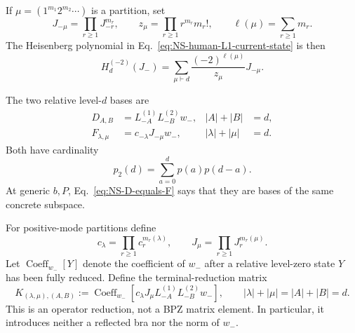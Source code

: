 \documentclass[11pt]{article}
\begin{document}
If \(\mu=(1^{m_1}2^{m_2}\cdots)\) is a partition, set
\begin{equation}
 J_{-\mu}=\prod_{r\geq1}J_{-r}^{m_r},
 \qquad
 z_\mu=\prod_{r\geq1}r^{m_r}m_r!,
 \qquad
 \ell(\mu)=\sum_{r\geq1}m_r.
\end{equation}
The Heisenberg polynomial in Eq.~\eqref{eq:NS-human-L1-current-state} is
then
\begin{equation}
 H_d^{(-2)}(J_-)
 =\sum_{\mu\vdash d}
   \frac{(-2)^{\ell(\mu)}}{z_\mu}J_{-\mu}.
 \label{eq:NS-human-H-partition-expansion}
\end{equation}

The two relative level-\(d\) bases are
\begin{align}
 D_{A,B}
 &=L_{-A}^{(1)}L_{-B}^{(2)}w_-,
 &|A|+|B|&=d,
 \label{eq:NS-relative-double-Vir-basis}\\
 F_{\lambda,\mu}
 &=c_{-\lambda}J_{-\mu}w_-,
 &|\lambda|+|\mu|&=d.
 \label{eq:NS-relative-current-basis}
\end{align}
Both have cardinality
\begin{equation}
 p_2(d)=\sum_{a=0}^dp(a)p(d-a).
\end{equation}
At generic \(b,P\), Eq.~\eqref{eq:NS-D-equals-F} says that they are bases
of the same concrete subspace.

For positive-mode partitions define
\begin{equation}
 c_\lambda=\prod_{r\geq1}c_r^{m_r(\lambda)},
 \qquad
 J_\mu=\prod_{r\geq1}J_r^{m_r(\mu)}.
\end{equation}
Let \(\operatorname{Coeff}_{w_-}[Y]\) denote the coefficient of \(w_-\)
after a relative level-zero state \(Y\) has been fully reduced.  Define the
terminal-reduction matrix
\begin{equation}
 \boxed{
 K_{(\lambda,\mu),(A,B)}
 :=\operatorname{Coeff}_{w_-}\!\left[
 c_\lambda J_\mu
 L_{-A}^{(1)}L_{-B}^{(2)}w_-
 \right],
 \qquad
 |\lambda|+|\mu|=|A|+|B|=d.}
 \label{eq:NS-terminal-reduction-matrix}
\end{equation}
This is an operator reduction, not a BPZ matrix element.  In particular,
it introduces neither a reflected bra nor the norm of \(w_-\).
\end{document}
